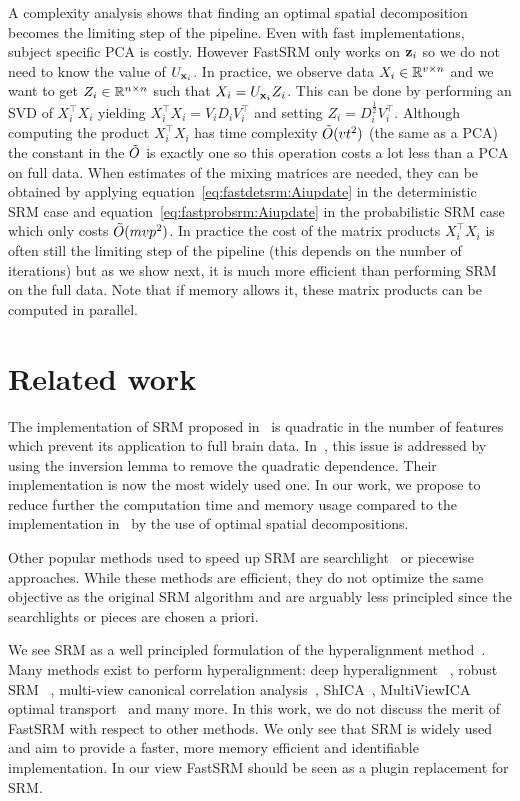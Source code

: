 \documentclass{article}
\begin{document}
A complexity analysis shows that finding an optimal spatial decomposition becomes the limiting
step of the pipeline.
%
Even with fast implementations, subject specific PCA
is costly.
%
However FastSRM only works on $\mathbf{z}_i$ so we do not need to know the value of
$U_{\mathbf{x}_i}$.
%
In practice, we observe data $X_i \in \mathbb{R}^{v \times n}$ and we want to get $Z_i
\in \mathbb{R}^{n \times n}$ such that $X_i = U_{\mathbf{x}_i} Z_i$.
%
This can be done by performing an
SVD of $X_i^{\top} X_i$ yielding $X_i^{\top}X_i= V_i D_i V_i^{\top}$ and setting
$Z_i = D_i^{\frac12} V_i^{\top}$.
%
Although computing the product $X_i^{\top} X_i$ has time complexity
$\tilde{O}(vt^2)$ (the same as a PCA) the constant in the $\tilde{O}$ is exactly one so
this operation costs a lot less than a PCA
on full data.
%
When estimates of the mixing matrices are needed, they can be obtained by
applying equation~\eqref{eq:fastdetsrm:Aiupdate} in the deterministic SRM case and
equation~\eqref{eq:fastprobsrm:Aiupdate} in the probabilistic SRM case which only costs
$\tilde{O}(mvp^2)$.
%
In practice the cost of the matrix products $X_i^{\top} X_i$ is often still the
limiting step of the pipeline (this depends on the number of iterations) but as
we show next, it is much more efficient than performing SRM on
the full data.
%
Note that if memory allows it, these matrix products can be
computed in parallel.
%

\section{Related work}
The implementation of SRM proposed in~\cite{chen2015reduced} is quadratic in the
number of features which prevent its application to full brain data.
In~\cite{anderson2016enabling}, this issue is addressed by using the
inversion lemma to remove the quadratic dependence. Their implementation is now the most widely used one.
In our work, we propose to reduce further the computation time and memory usage
compared to the implementation in~\cite{anderson2016enabling} by the use of
optimal spatial decompositions.

Other popular methods used to speed up SRM are searchlight~\cite{zhang2016searchlight} or piecewise~\cite{bazeille2021empirical}
approaches. While these methods are efficient, they do not optimize the same
objective as the original SRM algorithm and are arguably less principled since the
searchlights or pieces are chosen a priori.

We see SRM as a well principled formulation of the hyperalignment
method~\cite{haxby2011common}.
%
Many methods exist to perform hyperalignment: deep
hyperalignment~\cite{yousefnezhad2017deep} , robust
SRM~\cite{turek2018capturing} , multi-view canonical correlation
analysis~\cite{li2009joint}, ShICA~\cite{richard2021model},
MultiViewICA~\cite{richard2020modeling} optimal
transport~\cite{bazeille2019local} and many more.
%
In this work, we do not discuss the merit of FastSRM with respect to
other methods. We only see that SRM is widely used and aim to provide
a faster, more memory efficient and identifiable implementation.  In
our view FastSRM should be seen as a plugin replacement for SRM.
\end{document}
